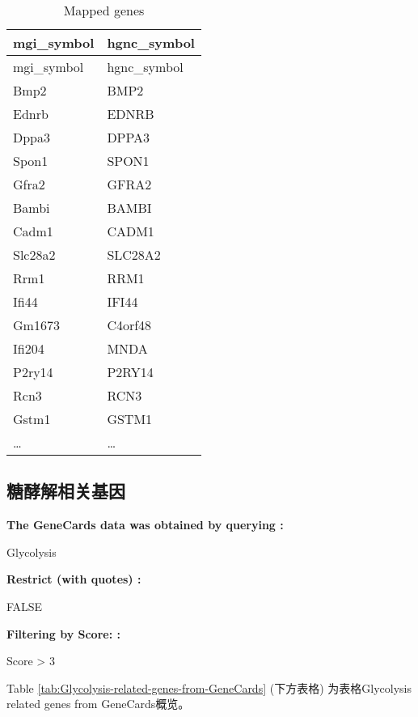 \documentclass[
]{article}
\begin{document}
\begin{longtable}[]{@{}ll@{}}
\caption{\label{tab:Mapped-genes}Mapped genes}\tabularnewline
\toprule
mgi\_symbol & hgnc\_symbol\tabularnewline
\midrule
\endfirsthead
\toprule
mgi\_symbol & hgnc\_symbol\tabularnewline
\midrule
\endhead
Bmp2 & BMP2\tabularnewline
Ednrb & EDNRB\tabularnewline
Dppa3 & DPPA3\tabularnewline
Spon1 & SPON1\tabularnewline
Gfra2 & GFRA2\tabularnewline
Bambi & BAMBI\tabularnewline
Cadm1 & CADM1\tabularnewline
Slc28a2 & SLC28A2\tabularnewline
Rrm1 & RRM1\tabularnewline
Ifi44 & IFI44\tabularnewline
Gm1673 & C4orf48\tabularnewline
Ifi204 & MNDA\tabularnewline
P2ry14 & P2RY14\tabularnewline
Rcn3 & RCN3\tabularnewline
Gstm1 & GSTM1\tabularnewline
\ldots{} & \ldots{}\tabularnewline
\bottomrule
\end{longtable}

\hypertarget{ux7cd6ux9175ux89e3ux76f8ux5173ux57faux56e0}{%
\subsection{糖酵解相关基因}\label{ux7cd6ux9175ux89e3ux76f8ux5173ux57faux56e0}}

\begin{center}\begin{tcolorbox}[colback=gray!10, colframe=gray!50, width=0.9\linewidth, arc=1mm, boxrule=0.5pt]
\textbf{
The GeneCards data was obtained by querying
:}

\vspace{0.5em}

    Glycolysis

\vspace{2em}


\textbf{
Restrict (with quotes)
:}

\vspace{0.5em}

    FALSE

\vspace{2em}


\textbf{
Filtering by Score:
:}

\vspace{0.5em}

    Score > 3

\vspace{2em}
\end{tcolorbox}
\end{center}

Table \ref{tab:Glycolysis-related-genes-from-GeneCards} (下方表格) 为表格Glycolysis related genes from GeneCards概览。
\end{document}
